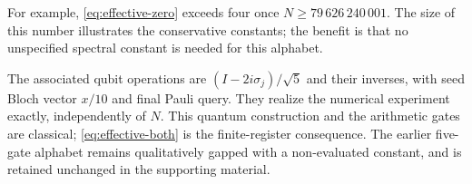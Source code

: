 For example, \eqref{eq:effective-zero} exceeds four once
$N\ge79\,626\,240\,001$. The size of this number illustrates the
conservative constants; the benefit is that no unspecified spectral
constant is needed for this alphabet.

The associated qubit operations are
$(I-2i\sigma_j)/\sqrt5$ and their inverses, with seed Bloch vector
$x/10$ and final Pauli query. They realize the numerical experiment
exactly, independently of $N$. This quantum construction and the
arithmetic gates are classical; \eqref{eq:effective-both} is the
finite-register consequence. The earlier five-gate alphabet remains
qualitatively gapped with a non-evaluated constant, and is retained
unchanged in the supporting material.
